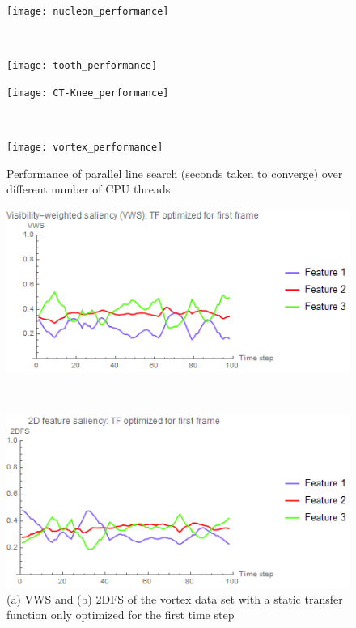 \begin{figure}
	\centering
	\begin{minipage}{.5\textwidth}
		\texttt{[image: nucleon\_performance]}
	\end{minipage}~
	\begin{minipage}{.5\textwidth}
		\texttt{[image: tooth\_performance]}
	\end{minipage}
	\begin{minipage}{.5\textwidth}
		\texttt{[image: CT-Knee\_performance]}
	\end{minipage}~
	\begin{minipage}{.5\textwidth}
		\texttt{[image: vortex\_performance]}
	\end{minipage}
	\caption[Performance of parallel line search]{Performance of parallel line search (seconds taken to converge) over different number of CPU threads}
	\label{fig:parallelsearch_performance}
\end{figure}

\begin{figure}
	\centering
	\begin{minipage}{.5\textwidth}
		\includegraphics[width=1\linewidth]{images/vorts_static_VWS}
		\subcaption{}
	\end{minipage}~
	\begin{minipage}{.5\textwidth}
		\includegraphics[width=1\linewidth]{images/vorts_static_2DFS}
		\subcaption{}
	\end{minipage}
	\caption{(a) VWS and (b) 2DFS of the vortex data set with a static transfer function only optimized for the first time step}
	\label{fig:vorts_static}
\end{figure}

